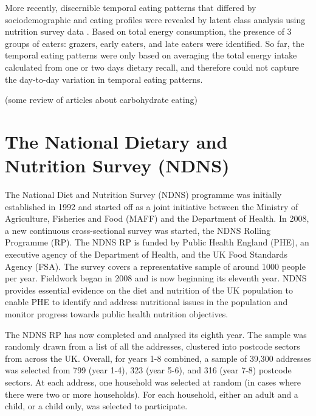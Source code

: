 More recently, discernible temporal eating patterns that differed by sociodemographic and eating profiles were revealed by latent class analysis using nutrition survey data \parencite{leech2017temporal, Mansukhani2018}. Based on total energy consumption, the presence of 3 groups of eaters: grazers, early eaters, and late eaters were identified. So far, the temporal eating patterns were only based on averaging the total energy intake calculated from one or two days dietary recall, and therefore could not capture the day-to-day variation in temporal eating patterns. 



(some review of articles about carbohydrate eating)




\section{The National Dietary and Nutrition Survey (NDNS)}\vspace{-0.3cm}

The National Diet and Nutrition Survey (NDNS) programme \parencite{NDNSdatabase2018} was initially established in 1992 and started off as a joint initiative between the Ministry of Agriculture, Fisheries and Food (MAFF) and the Department of Health. In 2008, a new continuous cross-sectional survey was started, the NDNS Rolling Programme (RP). The NDNS RP is funded by Public Health England (PHE), an executive agency of the Department of Health, and the UK Food Standards Agency (FSA). The survey covers a representative sample of around 1000 people per year. Fieldwork began in 2008 and is now beginning its eleventh year. NDNS provides essential evidence on the diet and nutrition of the UK population to enable PHE to identify and address nutritional issues in the population and monitor progress towards public health nutrition objectives.

The NDNS RP has now completed and analysed its eighth year. The sample was randomly drawn from a list of all the addresses, clustered into postcode sectors from across the UK. Overall, for years 1-8 combined, a sample of 39,300 addresses was selected from 799 (year 1-4), 323 (year 5-6), and 316 (year 7-8) postcode sectors. At each address, one household was selected at random (in cases where there were two or more households). For each household, either an adult and a child, or a child only, was selected to participate. 

